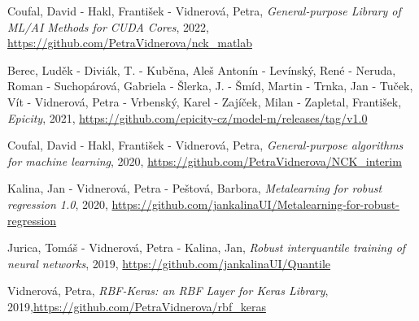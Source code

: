 \vspace{0.4em}
\noindent
Coufal, David - Hakl, František - Vidnerová, Petra, {\em General-purpose Library of ML/AI Methods for CUDA Cores}, 2022, \href{https://github.com/PetraVidnerova/nck_matlab}{ https://github.com/PetraVidnerova/nck\_matlab}

\vspace{0.4em}
\noindent
Berec, Luděk - Diviák, T. - Kuběna, Aleš Antonín - Levínský, René - Neruda, Roman - Suchopárová, Gabriela - Šlerka, J. - Šmíd, Martin - Trnka, Jan - Tuček, Vít - Vidnerová, Petra - Vrbenský, Karel - Zajíček, Milan - Zapletal, František, {\em Epicity}, 2021, \href{https://github.com/epicity-cz/model-m/releases/tag/v1.0}{https://github.com/epicity-cz/model-m/releases/tag/v1.0}

\vspace{0.4em}
\noindent
Coufal, David - Hakl, František - Vidnerová, Petra, {\em General-purpose algorithms for machine learning}, 2020, \href{https://github.com/PetraVidnerova/NCK_interim }{https://github.com/PetraVidnerova/NCK\_interim }

\vspace{0.4em}
\noindent
Kalina, Jan - Vidnerová, Petra - Peštová, Barbora, {\em Metalearning for robust regression 1.0}, 2020, \href{https://github.com/jankalinaUI/Metalearning-for-robust-regression}{https://github.com/jankalinaUI/Metalearning-for-robust-regression}

\vspace{0.4em}
\noindent
Jurica, Tomáš - Vidnerová, Petra - Kalina, Jan, {\em Robust interquantile training of neural networks}, 2019, \href{https://github.com/jankalinaUI/Quantile}{https://github.com/jankalinaUI/Quantile}

\vspace{0.4em}
\noindent
Vidnerová, Petra, {\em RBF-Keras: an RBF Layer for Keras Library}, 2019,\newline \href{https://github.com/PetraVidnerova/rbf_keras}{https://github.com/PetraVidnerova/rbf\_keras}

\vspace{0.4em}
\noindent

